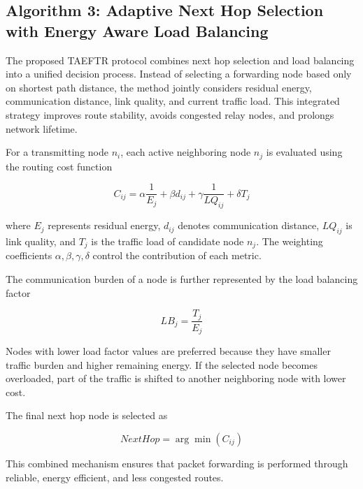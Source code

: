 \documentclass[a4paper,fleqn]{cas-dc}
\numberwithin{equation}{section}
\begin{document}
\subsection{Algorithm 3: Adaptive Next Hop Selection with Energy Aware Load Balancing}

The proposed TAEFTR protocol combines next hop selection and load balancing into a unified decision process. Instead of selecting a forwarding node based only on shortest path distance, the method jointly considers residual energy, communication distance, link quality, and current traffic load. This integrated strategy improves route stability, avoids congested relay nodes, and prolongs network lifetime.

For a transmitting node $n_i$, each active neighboring node $n_j$ is evaluated using the routing cost function

\begin{equation}
\label{eq:combined_cost}
C_{ij}=
\alpha \frac{1}{E_j}
+\beta d_{ij}
+\gamma \frac{1}{LQ_{ij}}
+\delta T_j
\end{equation}

where $E_j$ represents residual energy, $d_{ij}$ denotes communication distance, $LQ_{ij}$ is link quality, and $T_j$ is the traffic load of candidate node $n_j$. The weighting coefficients $\alpha,\beta,\gamma,\delta$ control the contribution of each metric.

The communication burden of a node is further represented by the load balancing factor

\begin{equation}
\label{eq:lb_factor}
LB_j=\frac{T_j}{E_j}
\end{equation}

Nodes with lower load factor values are preferred because they have smaller traffic burden and higher remaining energy. If the selected node becomes overloaded, part of the traffic is shifted to another neighboring node with lower cost.

The final next hop node is selected as

\begin{equation}
\label{eq:besthop}
NextHop=\arg\min(C_{ij})
\end{equation}

This combined mechanism ensures that packet forwarding is performed through reliable, energy efficient, and less congested routes.
\end{document}
